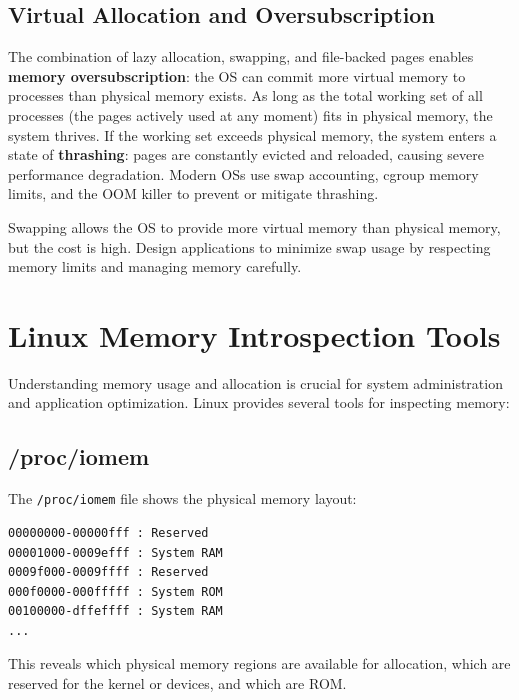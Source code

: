 \documentclass[11pt]{article}
\begin{document}
\subsection{Virtual Allocation and Oversubscription}

The combination of lazy allocation, swapping, and file-backed pages enables \textbf{memory oversubscription}: the OS can commit more virtual memory to processes than physical memory exists. As long as the total working set of all processes (the pages actively used at any moment) fits in physical memory, the system thrives. If the working set exceeds physical memory, the system enters a state of \textbf{thrashing}: pages are constantly evicted and reloaded, causing severe performance degradation. Modern OSs use swap accounting, cgroup memory limits, and the OOM killer to prevent or mitigate thrashing.

\begin{keytip}
Swapping allows the OS to provide more virtual memory than physical memory, but the cost is high. Design applications to minimize swap usage by respecting memory limits and managing memory carefully.
\end{keytip}

\section{Linux Memory Introspection Tools}

Understanding memory usage and allocation is crucial for system administration and application optimization. Linux provides several tools for inspecting memory:

\subsection{/proc/iomem}

The \texttt{/proc/iomem} file shows the physical memory layout:

\begin{lstlisting}[caption={Example /proc/iomem output}]
00000000-00000fff : Reserved
00001000-0009efff : System RAM
0009f000-0009ffff : Reserved
000f0000-000fffff : System ROM
00100000-dffeffff : System RAM
...
\end{lstlisting}

This reveals which physical memory regions are available for allocation, which are reserved for the kernel or devices, and which are ROM.
\end{document}
